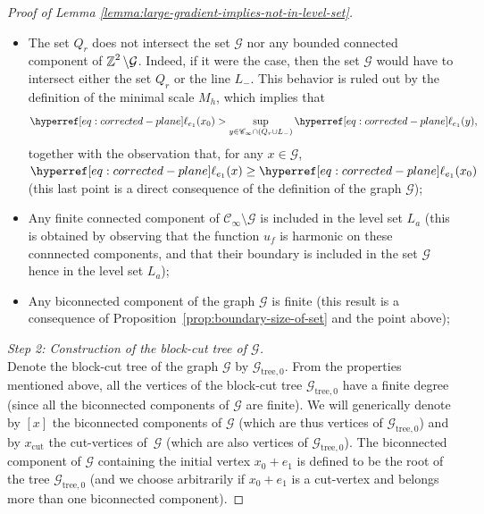 \documentclass[12pt]{amsart}
\numberwithin{equation}{section}
\begin{document}
\begin{proof}[Proof of Lemma \ref{lemma:large-gradient-implies-not-in-level-set}]
\begin{itemize}
			\item The set $Q_r$ does not intersect the set $\mathcal{G}$ nor any bounded connected component of $\operatorname{\mathbb{Z}}^2 \setminus \mathcal{G}$. Indeed, if it were the case, then the set $\mathcal{G}$ would have to intersect either the set $Q_r$ or the line $L_-$. This behavior is ruled out by the definition of the minimal scale $M_h$, which implies that 
			$$\ellp{e_1}(x_0) > \sup_{y \in \mathscr{C}_\infty \cap ( Q_r \cup L_-)} \ellp{e_1} (y),$$
			together with the observation that, for any $x \in \mathcal{G}$, $\ellp{e_1}(x) \geq \ellp{e_1}(x_0)$ (this last point is a direct consequence of the definition of the graph $\mathcal{G}$);
			\item Any finite connected component of $\mathscr{C}_\infty \setminus \mathcal{G}$ is included in the level set $L_a$ (this is obtained by observing that the function $u_f$ is harmonic on these connnected components, and that their boundary is included in the set $\mathcal{G}$ hence in the level set $L_a$);
			\item Any biconnected component of the graph $\mathcal{G}$ is finite (this result is a consequence of Proposition~\ref{prop:boundary-size-of-set} and the point above);
		\end{itemize}
		\medskip
		
		{\it Step 2: Construction of the block-cut tree of $\mathcal{G}$.} \\ 
		Denote the block-cut tree of the graph $\mathcal{G}$ by $\mathcal{G}_{\mathrm{tree}, 0}$. From the properties mentioned above, all the vertices of the block-cut tree $\mathcal{G}_{\mathrm{tree},0}$ have a finite degree (since all the biconnected components of $\mathcal{G}$ are finite). We will generically denote by $[x]$ the biconnected components of $\mathcal{G}$ (which are thus vertices of $\mathcal{G}_{\mathrm{tree},0}$) and by $x_{\mathrm{cut}}$ the cut-vertices of~$\mathcal{G}$ (which are also vertices of $\mathcal{G}_{\mathrm{tree},0}$). The biconnected component of $\mathcal{G}$ containing the initial vertex $x_0+e_1$ is defined to be the root of the tree $\mathcal{G}_{\mathrm{tree},0}$ (and we choose arbitrarily if $x_0 + e_1$ is a cut-vertex and belongs more than one biconnected component). 
		

\end{proof}
\end{document}
